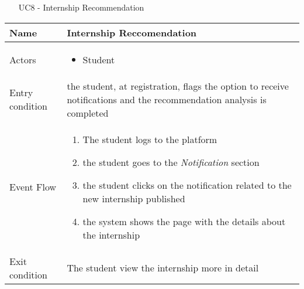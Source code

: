 				
					
				
				\begin{table} [H]
					\centering
					\begin{itemize}
						\item [UC8] - Internship Recommendation
					\end{itemize}
					\begin{tabular}{|| P{7.5cm} | P{7.5cm} ||}
						\hline
						Name & Internship Reccomendation \\
						\hline
						Actors & \parbox{5cm}{\begin{itemize}
								\item Student
							\end{itemize}
						} \\
						\hline
						Entry condition & the student, at registration, flags the 
						option to receive notifications and the recommendation analysis is completed\\
						\hline
						Event Flow & \parbox{5cm}{\begin{enumerate}
								\item The student logs to the platform  
								\item the student goes to the \textit{Notification} 
								section
								\item  the student clicks on the notification 
								related to the new internship 
								published
								\item the system shows the page with the 
								details about the internship  
						\end{enumerate}} \\
						\hline 
						Exit condition & The student view the internship more in 
						detail \\
						\hline
					\end{tabular}
				\end{table}
				
